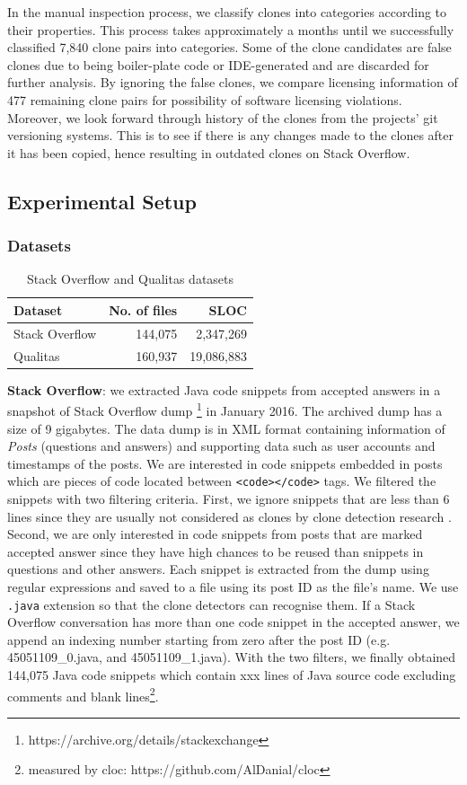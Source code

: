 \documentclass{sig-alternate-05-2015}
\begin{document}
In the manual inspection process, we classify clones into categories according to their properties. This process takes approximately a months until we successfully classified 7,840 clone pairs into categories. Some of the clone candidates are false clones due to being boiler-plate code or IDE-generated and are discarded for further analysis. By ignoring the false clones, we compare licensing information of 477 remaining clone pairs for possibility of software licensing violations. Moreover, we look forward through history of the clones from the projects' git versioning systems. This is to see if there is any changes made to the clones after it has been copied, hence resulting in outdated clones on Stack Overflow.

\subsection{Experimental Setup}

\subsubsection{Datasets}
\begin{table}
	\centering
	\caption{Stack Overflow and Qualitas datasets}
	\label{tab:datasets}
	\small
	\begin{tabular}{l|r|r}
		\hline 
		Dataset & No. of files & SLOC \\
		\hline
		Stack Overflow & 144,075 & 2,347,269 \\ 
		\hline 
		Qualitas &  160,937 & 19,086,883 \\ 
		\hline 
	\end{tabular} 
\end{table}

\textbf{Stack Overflow}: we extracted Java code snippets from accepted answers in a snapshot of Stack Overflow dump \footnote{https://archive.org/details/stackexchange} in January 2016. The archived dump has a size of 9 gigabytes. The data dump is in XML format containing information of \textit{Posts} (questions and answers) and supporting data such as user accounts and timestamps of the posts. We are interested in code snippets embedded in posts which are pieces of code located between \texttt{<code></code>} tags. We filtered the snippets with two filtering criteria. First, we ignore snippets that are less than 6 lines since they are usually not considered as clones by clone detection research \cite{something}. Second, we are only interested in code snippets from posts that are marked accepted answer since they have high chances to be reused than snippets in questions and other answers. Each snippet is extracted from the dump using regular expressions and saved to a file using its post ID as the file's name. We use \texttt{.java} extension so that the clone detectors can recognise them. If a Stack Overflow conversation has more than one code snippet in the accepted answer, we append an indexing number starting from zero after the post ID (e.g. 45051109\_0.java, and 45051109\_1.java). With the two filters, we finally obtained 144,075 Java code snippets which contain xxx lines of Java source code excluding comments and blank lines\footnote{measured by cloc: https://github.com/AlDanial/cloc}.
\end{document}
